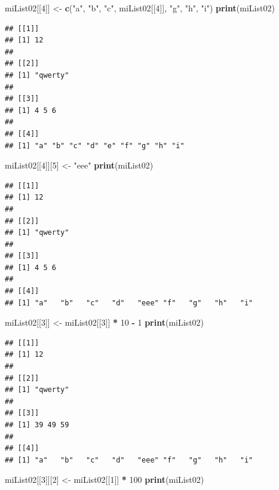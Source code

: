 \documentclass[]{book}
\newenvironment{Shaded}{\begin{snugshade}}{\end{snugshade}}
\newcommand{\KeywordTok}[1]{\textcolor[rgb]{0.13,0.29,0.53}{\textbf{#1}}}
\newcommand{\DecValTok}[1]{\textcolor[rgb]{0.00,0.00,0.81}{#1}}
\newcommand{\StringTok}[1]{\textcolor[rgb]{0.31,0.60,0.02}{#1}}
\newcommand{\OperatorTok}[1]{\textcolor[rgb]{0.81,0.36,0.00}{\textbf{#1}}}
\newcommand{\NormalTok}[1]{#1}
\begin{document}
\begin{Shaded}
\begin{Highlighting}[]
\NormalTok{miList02[[}\DecValTok{4}\NormalTok{]] <-}\StringTok{ }\KeywordTok{c}\NormalTok{(}\StringTok{"a"}\NormalTok{, }\StringTok{"b"}\NormalTok{, }\StringTok{"c"}\NormalTok{, miList02[[}\DecValTok{4}\NormalTok{]], }\StringTok{"g"}\NormalTok{, }\StringTok{"h"}\NormalTok{, }\StringTok{"i"}\NormalTok{)}
\KeywordTok{print}\NormalTok{(miList02)}
\end{Highlighting}
\end{Shaded}

\begin{verbatim}
## [[1]]
## [1] 12
## 
## [[2]]
## [1] "qwerty"
## 
## [[3]]
## [1] 4 5 6
## 
## [[4]]
## [1] "a" "b" "c" "d" "e" "f" "g" "h" "i"
\end{verbatim}

\begin{Shaded}
\begin{Highlighting}[]
\NormalTok{miList02[[}\DecValTok{4}\NormalTok{]][}\DecValTok{5}\NormalTok{] <-}\StringTok{ "eee"}
\KeywordTok{print}\NormalTok{(miList02)}
\end{Highlighting}
\end{Shaded}

\begin{verbatim}
## [[1]]
## [1] 12
## 
## [[2]]
## [1] "qwerty"
## 
## [[3]]
## [1] 4 5 6
## 
## [[4]]
## [1] "a"   "b"   "c"   "d"   "eee" "f"   "g"   "h"   "i"
\end{verbatim}

\begin{Shaded}
\begin{Highlighting}[]
\NormalTok{miList02[[}\DecValTok{3}\NormalTok{]] <-}\StringTok{ }\NormalTok{miList02[[}\DecValTok{3}\NormalTok{]] }\OperatorTok{*}\StringTok{ }\DecValTok{10} \OperatorTok{-}\StringTok{ }\DecValTok{1}
\KeywordTok{print}\NormalTok{(miList02)}
\end{Highlighting}
\end{Shaded}

\begin{verbatim}
## [[1]]
## [1] 12
## 
## [[2]]
## [1] "qwerty"
## 
## [[3]]
## [1] 39 49 59
## 
## [[4]]
## [1] "a"   "b"   "c"   "d"   "eee" "f"   "g"   "h"   "i"
\end{verbatim}

\begin{Shaded}
\begin{Highlighting}[]
\NormalTok{miList02[[}\DecValTok{3}\NormalTok{]][}\DecValTok{2}\NormalTok{] <-}\StringTok{ }\NormalTok{miList02[[}\DecValTok{1}\NormalTok{]] }\OperatorTok{*}\StringTok{ }\DecValTok{100}
\KeywordTok{print}\NormalTok{(miList02)}
\end{Highlighting}
\end{Shaded}
\end{document}
